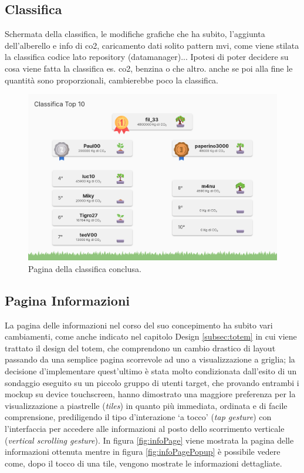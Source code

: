 %
%
\subsection{Classifica}
Schermata della classifica, le modifiche grafiche che ha subito, l'aggiunta dell'alberello e info di co2, caricamento dati solito pattern mvi, come viene stilata la classifica codice lato repository (datamanager)... Ipotesi di poter decidere su cosa viene fatta la classifica es. co2, benzina o che altro. anche se poi alla fine le quantità sono proporzionali, cambierebbe poco la classifica.


\begin{figure}[h]
  \centering
  \includegraphics[width=\textwidth]{img/totem/screenshot/top10screen.png}
  \caption{Pagina della classifica conclusa.}
  \label{fig:top10screen}
\end{figure}

%
%
\subsection{Pagina Informazioni}
La pagina delle informazioni nel corso del suo concepimento ha subito vari cambiamenti, come anche indicato nel capitolo Design \ref{subsec:totem} in cui viene trattato il design del totem, che comprendono un cambio drastico di layout passando da una semplice pagina scorrevole ad uno a visualizzazione a griglia; la decisione d'implementare quest'ultimo è stata molto condizionata dall'esito di un sondaggio eseguito su un piccolo gruppo di utenti target, che provando entrambi i mockup su device touchscreen, hanno dimostrato una maggiore preferenza per la visualizzazione a piastrelle (\textit{tiles}) in quanto più immediata, ordinata e di facile comprensione, prediligendo il tipo d'interazione \enquote*{a tocco} (\textit{tap gesture}) con l'interfaccia per accedere alle informazioni al posto dello scorrimento verticale (\textit{vertical scrolling gesture}). In figura \ref{fig:infoPage} viene mostrata la pagina delle informazioni ottenuta mentre in figura \ref{fig:infoPagePopup} è possibile vedere come, dopo il tocco di una tile, vengono mostrate le informazioni dettagliate.


